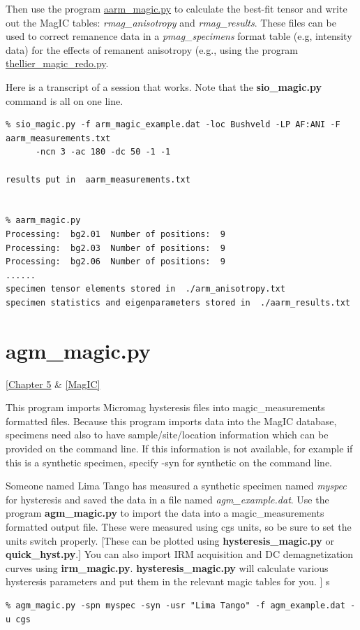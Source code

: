 \documentclass[11pt]{book}
\begin{document}
{{{{Then use the program \href{#aarm_magic.py}{aarm\_magic.py}  to calculate the best-fit tensor and write out the MagIC tables: {\it rmag\_anisotropy} and {\it rmag\_results}.   These files can be used to correct remanence data in a {\it pmag\_specimens} format table (e.g, intensity data) for the effects of remanent anisotropy (e.g., using the program \href{#thellier_magic.py}{thellier\_magic\_redo.py}.

Here is a transcript of a session that works.   Note that the {\bf  sio\_magic.py}  command is all on one line.  

\begin{verbatim}
% sio_magic.py -f arm_magic_example.dat -loc Bushveld -LP AF:ANI -F aarm_measurements.txt 
      -ncn 3 -ac 180 -dc 50 -1 -1

results put in  aarm_measurements.txt


% aarm_magic.py 
Processing:  bg2.01  Number of positions:  9
Processing:  bg2.03  Number of positions:  9
Processing:  bg2.06  Number of positions:  9
......
specimen tensor elements stored in  ./arm_anisotropy.txt
specimen statistics and eigenparameters stored in  ./aarm_results.txt

\end{verbatim}

\section {\bf agm\_magic.py} [\href{http://magician.ucsd.edu/Essentials/WebBook2.html#magnetic_hysteresis}{Chapter 5} \& \href{#MagIC}{[MagIC]}
\label{ex:agm_magic}


This program imports Micromag  hysteresis files into magic\_measurements formatted files.   
Because this program imports data into the MagIC database, specimens need also to have sample/site/location information which can be provided on the command line. If this information is not available, for example if this is a synthetic specimen,  specify -syn for synthetic on the command line.    

Someone named Lima Tango has measured a synthetic specimen named {\it myspec}  for hysteresis and saved the data in a file named {\it agm\_example.dat}.   Use the program {\bf agm\_magic.py} to import the data into a magic\_measurements formatted output file.  These were measured using cgs units, so be sure to set the units switch properly.      [These can be plotted using {\bf hysteresis\_magic.py} or {\bf quick\_hyst.py}.]  You can also import IRM acquisition and DC demagnetization curves using {\bf irm\_magic.py}.   {\bf hysteresis\_magic.py} will calculate various hysteresis parameters and put them in the relevant magic tables for you.  ]   
s
\begin{verbatim}
% agm_magic.py -spn myspec -syn -usr "Lima Tango" -f agm_example.dat -u cgs 


\end{verbatim}}}}}
\end{document}
